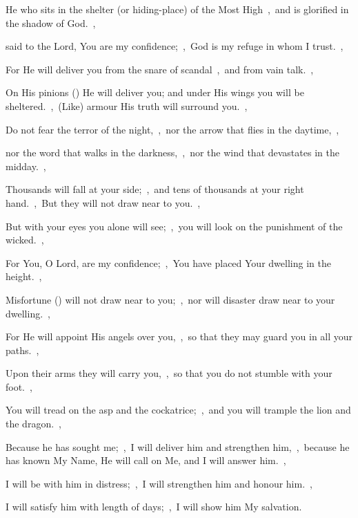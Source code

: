 \documentclass[12pt,twoside,a5paper]{article}
\begin{document}
\begin{normalparskip}
  He who sits in the shelter (or hiding-place) of the Most High~\sep\ and is glorified in the shadow of God.~\sep


  said to the Lord, You are my confidence;~\sep\ God is my refuge in whom I trust.~\sep

  For He will deliver you from the snare of scandal~\sep\ and from vain talk.~\sep

  On His pinions () He will deliver you; and under His wings you will be sheltered.~\sep\ (Like) armour His truth will surround you.~\sep

  Do not fear the terror of the night,~\sep\ nor the arrow that flies in the daytime,~\sep

  nor the word that walks in the darkness,~\sep\ nor the wind that devastates in the midday.~\sep

  Thousands will fall at your side;~\sep\ and tens of thousands at your right hand.~\sep\ But they will not draw near to you.~\sep

  But with your eyes you alone will see;~\sep\ you will look on the punishment of the wicked.~\sep

  For You, O Lord, are my confidence;~\sep\ You have placed Your dwelling in the height.~\sep

  Misfortune () will not draw near to you;~\sep\ nor will disaster draw near to your dwelling.~\sep

  For He will appoint His angels over you,~\sep\ so that they may guard you in all your paths.~\sep

  Upon their arms they will carry you,~\sep\ so that you do not stumble with your foot.~\sep

  You will tread on the asp and the cockatrice;~\sep\ and you will trample the lion and the dragon.~\sep

  Because he has sought me;~\sep\ I will deliver him and strengthen him,~\sep\ because he has known My Name, He will call on Me, and I will answer him.~\sep

  I will be with him in distress;~\sep\ I will strengthen him and honour him.~\sep

  I will satisfy him with length of days;~\sep\ I will show him My salvation.
\end{normalparskip}

\end{document}

